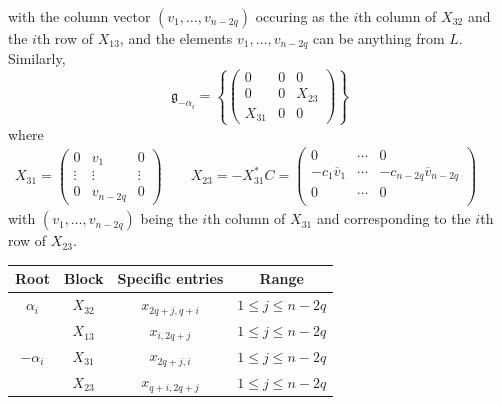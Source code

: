 \documentclass[12pt]{article}
\theoremstyle{definition}
\newcommand{\lb}{\left\{}
\newcommand{\rb}{\right\}}
\newcommand{\ov}{\overline}
\newcommand{\frakg}{\mathfrak{g}}
\begin{document}
with the column vector $(v_1, \ldots, v_{n-2q})$ occuring as the $i$th column of $X_{32}$ and the $i$th row of $X_{13}$, and the elements $v_1, \ldots, v_{n-2q}$ can be anything from $L$. Similarly,
\[
	\frakg_{-\alpha_i} = \lb
	\begin{pmatrix}
		0 & 0 & 0 \\
		0 & 0 & X_{23} \\
		X_{31} & 0 & 0
	\end{pmatrix}
	\rb
\]
where
\begin{align*}
	X_{31} =
	\begin{pmatrix}
		0 & v_1 & 0 \\
		\vdots & \vdots & \vdots \\
		0 & v_{n-2q} & 0
	\end{pmatrix}
	\qquad
	X_{23} = - X_{31}^* C =
	\begin{pmatrix}
		0 & \cdots & 0 \\
		-  c_1 \ov v_1 & \cdots & -   c_{n-2q} \ov v_{n-2q} \\
		0 & \cdots & 0 \\
	\end{pmatrix}
	\qquad
\end{align*}
with $(v_1, \ldots, v_{n-2q})$ being the $i$th column of $X_{31}$ and corresponding to the $i$th row of $X_{23}$. 
\begin{center}
	\begin{tabular}{c|c|c|c}
		Root & Block & Specific entries & Range \\
		\hline
		$\alpha_i$ & $X_{32}$ & $x_{2q+j,q+i}$ & $1 \le j \le n-2q$ \\
		& $X_{13}$ & $x_{i, 2q+j}$ & $1 \le j \le n-2q$ \\
		\hline
		$- \alpha_i$ & $X_{31}$ & $x_{2q+j, i}$ & $1 \le j \le n-2q$ \\
		& $X_{23}$ & $x_{q+i, 2q+j}$ & $1 \le j \le n-2q$
	\end{tabular}
\end{center}

\newpage
\raggedright


\nocite{*}
\end{document}
